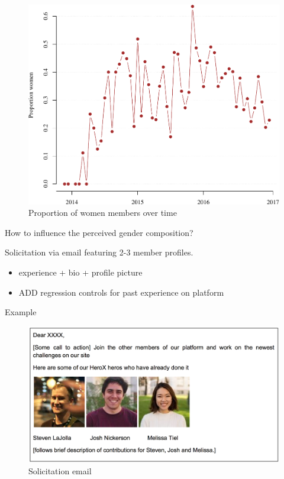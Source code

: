 \begin{frame}

\begin{figure}
\centering
\includegraphics{deck_files/figure-beamer/overtime-1.pdf}
\caption{Proportion of women members over time}
\end{figure}

\end{frame}

\begin{frame}{How to influence the perceived gender composition?}

Solicitation via email featuring 2-3 member profiles.

\begin{itemize}
\item
  experience + bio + profile picture
\item
  ADD regression controls for past experience on platform
\end{itemize}

\end{frame}

\begin{frame}{Example}

\begin{figure}
\centering
\includegraphics{solicit_gender_compo.png}
\caption{Solicitation email}
\end{figure}

\end{frame}

